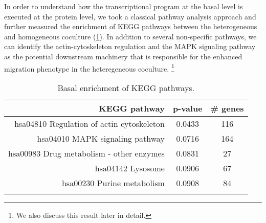 In order to understand how the transcriptional program
at the basal level is executed at the protein level,
we took a classical pathway analysis approach and further 
measured
the enrichment of KEGG pathways between the heterogeneous 
and homogeneous 
coculture (\ref{table:h838_gage_kegg}). 
In addition to several non-specific pathways, 
we can identify the actin-cytoskeleton regulation and 
the MAPK signaling pathway as the potential downstream 
machinery that is responsible for the enhanced migration
phenotype in the heteregeneous coculture.%
\footnote{We also discuss this
result later in detail.} 

\begin{longtable}{rcc}
\caption{Basal enrichment of KEGG pathways.} \\ 
\hline
KEGG pathway & p-value & \# genes \\
\hline
\rowcolor{Gray} hsa04810 Regulation of actin cytoskeleton & 0.0433 &  116\\
hsa04010 MAPK signaling pathway &  0.0716 &   164\\
\rowcolor{Gray} hsa00983 Drug metabolism - other enzymes & 0.0831 &   27\\
hsa04142 Lysosome &  0.0906 &    67\\
\rowcolor{Gray} hsa00230 Purine metabolism &  0.0908 &  84\\
\hline
\label{table:h838_gage_kegg}
\end{longtable}


